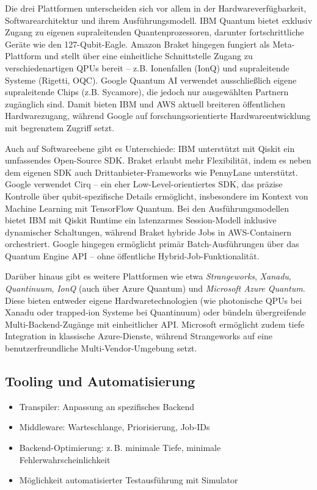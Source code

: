 Die drei Plattformen unterscheiden sich vor allem in der Hardwareverfügbarkeit, Softwarearchitektur und ihrem Ausführungsmodell. IBM Quantum bietet exklusiv Zugang zu eigenen supraleitenden Quantenprozessoren, darunter fortschrittliche Geräte wie den 127-Qubit-Eagle. Amazon Braket hingegen fungiert als Meta-Plattform und stellt über eine einheitliche Schnittstelle Zugang zu verschiedenartigen QPUs bereit – z.B. Ionenfallen (IonQ) und supraleitende Systeme (Rigetti, OQC). Google Quantum AI verwendet ausschließlich eigene supraleitende Chips (z.B. Sycamore), die jedoch nur ausgewählten Partnern zugänglich sind. Damit bieten IBM und AWS aktuell breiteren öffentlichen Hardwarezugang, während Google auf forschungsorientierte Hardwareentwicklung mit begrenztem Zugriff setzt.

Auch auf Softwareebene gibt es Unterschiede: IBM unterstützt mit Qiskit ein umfassendes Open-Source SDK. Braket erlaubt mehr Flexibilität, indem es neben dem eigenen SDK auch Drittanbieter-Frameworks wie PennyLane unterstützt. Google verwendet Cirq – ein eher Low-Level-orientiertes SDK, das präzise Kontrolle über qubit-spezifische Details ermöglicht, insbesondere im Kontext von Machine Learning mit TensorFlow Quantum. Bei den Ausführungsmodellen bietet IBM mit Qiskit Runtime ein latenzarmes Session-Modell inklusive dynamischer Schaltungen, während Braket hybride Jobs in AWS-Containern orchestriert. Google hingegen ermöglicht primär Batch-Ausführungen über das Quantum Engine API – ohne öffentliche Hybrid-Job-Funktionalität.

Darüber hinaus gibt es weitere Plattformen wie etwa \textit{Strangeworks}, \textit{Xanadu}, \textit{Quantinuum}, \textit{IonQ} (auch über Azure Quantum) und \textit{Microsoft Azure Quantum}. Diese bieten entweder eigene Hardwaretechnologien (wie photonische QPUs bei Xanadu oder trapped-ion Systeme bei Quantinuum) oder bündeln übergreifende Multi-Backend-Zugänge mit einheitlicher API. Microsoft ermöglicht zudem tiefe Integration in klassische Azure-Dienste, während Strangeworks auf eine benutzerfreundliche Multi-Vendor-Umgebung setzt.

\subsection{Tooling und Automatisierung}
\begin{itemize}
    \item Transpiler: Anpassung an spezifisches Backend
    \item Middleware: Warteschlange, Priorisierung, Job-IDs
    \item Backend-Optimierung: z.\,B. minimale Tiefe, minimale Fehlerwahrscheinlichkeit
    \item Möglichkeit automatisierter Testausführung mit Simulator
\end{itemize}

